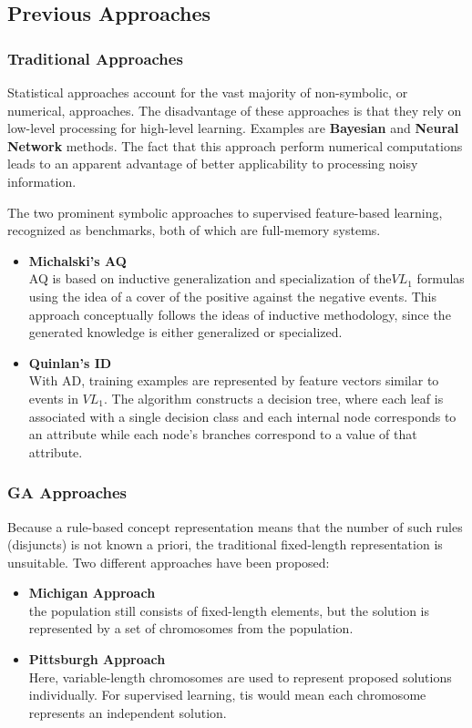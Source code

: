 \documentclass[../main.tex]{subfiles}
\begin{document}
\subsection{Previous Approaches}

\subsubsection{Traditional Approaches}
Statistical approaches account for the vast majority of non-symbolic, or numerical, approaches. The disadvantage of
these approaches is that they rely on low-level processing for high-level learning. Examples are \textbf{Bayesian} and \textbf{Neural Network} methods. The fact that this approach perform numerical computations leads to an
apparent advantage of better applicability to processing noisy information.

The two prominent symbolic approaches to supervised feature-based learning, recognized
as benchmarks, both of which are full-memory systems.

\begin{itemize}
	\item \textbf{Michalski's AQ} \\
	AQ is based on inductive generalization and specialization of the$VL_1$ formulas using the idea of a cover of the
	positive against the negative events. This approach conceptually follows the ideas of inductive methodology, since
	the generated knowledge is either generalized or specialized.
	\item \textbf{Quinlan's  ID} \\
	With AD, training examples are represented by feature vectors similar to events in $VL_1$.  The algorithm
	constructs a decision tree, where each leaf is associated with a single decision class and each internal node
	corresponds to an attribute while each node's branches correspond to a value of that attribute.
\end{itemize}

\subsubsection{GA Approaches}
Because a rule-based concept representation means that the number of such rules (disjuncts) is not known a priori,  the
traditional fixed-length representation is unsuitable. Two different approaches have been proposed:

\begin{itemize}
	\item \textbf{Michigan Approach} \\
	the population still consists of fixed-length elements, but the solution is represented by a set of chromosomes
	from the population.
	\item \textbf{Pittsburgh Approach} \\
	Here, variable-length chromosomes are used to represent proposed solutions individually. For supervised learning, tis would mean each chromosome represents an independent solution.
\end{itemize}
\end{document}
